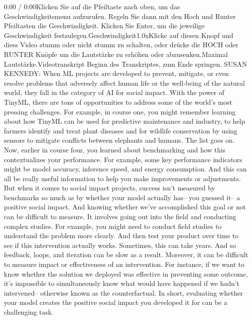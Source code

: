 {{{{{{{{    0:00 / 0:00Klicken Sie auf die Pfeiltaste nach oben, um das Geschwindigkeitsmenu aufzurufen. Regeln Sie dann mit den Hoch und Runter Pfeiltasten die Geschwindigkeit. Klicken Sie Enter, um die jeweilige Geschwindigkeit festzulegen.Geschwindigkeit1.0xKlicke auf diesen Knopf und diess Video stumm oder nicht stumm zu schalten, oder drücke die HOCH oder RUNTER Knöpfe um die Lautstärke zu erhöhen oder abzusenken.Maximal Lautstärke.Videotranskript
    Beginn des Transkriptes, zum Ende springen.
    SUSAN KENNEDY: When ML projects are developed to prevent, mitigate,
    or even resolve problems that adversely affect
    human life or the well-being of the natural world,
    they fall in the category of AI for social impact.
    With the power of TinyML, there are tons of opportunities
    to address some of the world's most pressing challenges.
    For example, in course one, you might remember
    learning about how TinyML can be used for predictive maintenance
    and industry, to help farmers identify and treat plant diseases
    and for wildlife conservation by using sensors to mitigate
    conflicts between elephants and humans.
    The list goes on.
    Now, earlier in course four, you learned about benchmarking
    and how this contextualizes your performance.
    For example, some key performance indicators
    might be model accuracy, inference speed, and energy consumption.
    And this can all be really useful information
    to help you make improvements or adjustments.
    But when it comes to social impact projects,
    success isn't measured by benchmarks so much as by whether your model actually
    has--
    you guessed it-- a positive social impact.
    And knowing whether we've accomplished this goal or not
    can be difficult to measure.
    It involves going out into the field and conducting complex studies.
    For example, you might need to conduct field studies
    to understand the problem more clearly.
    And then test your product over time to see if this intervention actually
    works.
    Sometimes, this can take years.
    And so feedback, loops, and iteration can be slow as a result. Moreover,
    it can be difficult to measure impact or effectiveness of an intervention.
    For instance, if we want to know whether the solution we deployed
    was effective in preventing some outcome,
    it's impossible to simultaneously know what
    would have happened if we hadn't intervened-- otherwise known
    as the counterfactual.
    In short, evaluating whether your model creates
    the positive social impact you developed it for can be a challenging task.
}}}}}}}}
